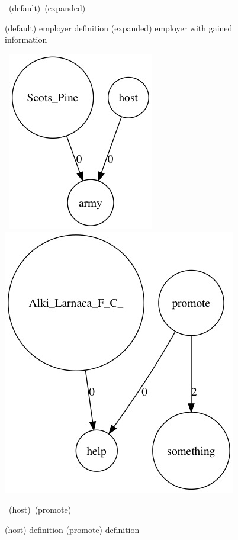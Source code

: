 \documentclass[twoside,b5paper,10pt]{article}
\begin{document}
\begin{figure}[htb]
{{    }
  }
  \vspace{3pt}
  \hbox{\hspace{0.13\columnwidth} (default) \hspace{0.3\columnwidth} (expanded)}
  \caption{ (default) employer definition (expanded) employer with gained information}
  \label{fig:employer}
\end{figure}

\begin{figure}[htb]
  \vspace{3pt}
  \centerline{
  \hbox{
  \hspace{0.0in}
        \includegraphics[scale=0.4]{Figure/host.jpg}
        \hspace{0.1\columnwidth}
        \includegraphics[scale=0.4]{Figure/promote.jpg}
    }
  }
  \vspace{3pt}
  \hbox{\hspace{0.13\columnwidth} (host) \hspace{0.3\columnwidth} (promote)}
  \caption{ (host) definition (promote) definition}
  \label{fig:errors}
\end{figure}
\end{document}
